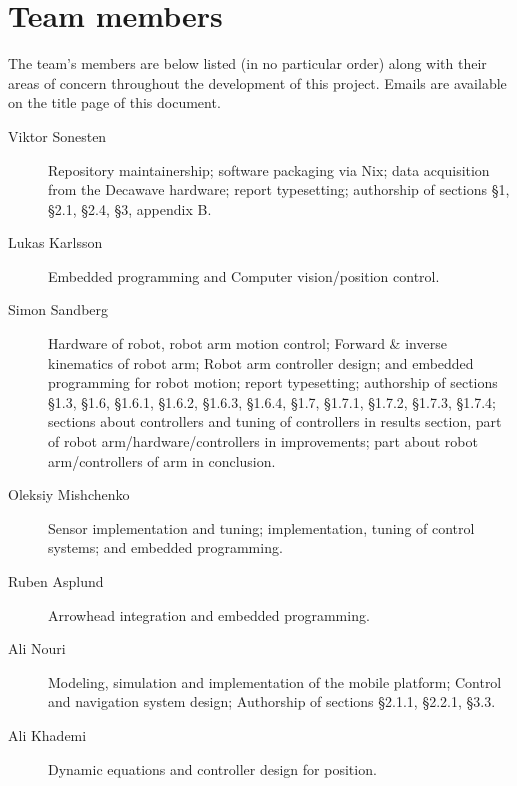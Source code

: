 \section{Team members}
The team's members are below listed (in no particular order) along with their areas of concern throughout the development of this project.
Emails are available on the title page of this document.

\begin{description}
\item[Viktor Sonesten] Repository maintainership; software packaging
  via Nix; data acquisition from the Decawave hardware; report
  typesetting; authorship of sections §1, §2.1, §2.4, §3, appendix B.

    \item[Lukas Karlsson]
    Embedded programming and
    Computer vision/position control.

    \item[Simon Sandberg]
    Hardware of robot, robot arm motion control;
    Forward & inverse kinematics of robot arm;
    Robot arm controller design;
    and embedded programming for robot motion; report
    typesetting; authorship of sections §1.3, §1.6, §1.6.1, §1.6.2, §1.6.3, §1.6.4, §1.7, §1.7.1, §1.7.2, §1.7.3, §1.7.4;
    sections about controllers and tuning of controllers in results section, part of robot arm/hardware/controllers in improvements;
    part about robot arm/controllers of arm in conclusion.

    \item[Oleksiy Mishchenko]
    Sensor implementation and tuning;
    implementation, tuning of control systems; and
    embedded programming.

    \item[Ruben Asplund]
    Arrowhead integration and embedded programming.

    \item[Ali Nouri]
    Modeling, simulation and implementation of the mobile platform;
    Control and navigation system design;
    Authorship of sections §2.1.1, §2.2.1, §3.3.  

    \item[Ali Khademi]
    Dynamic equations and controller design for position.
\end{description}

